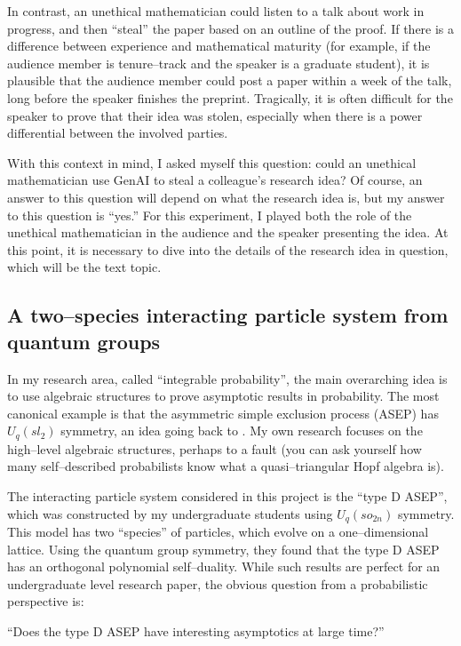 \documentclass{article}
\begin{document}
In contrast, an unethical mathematician could listen to a talk about work in progress, and then ``steal'' the paper based on an outline of the proof. If there is a difference between experience and mathematical maturity (for example, if the audience member is tenure--track and the speaker is a graduate student), it is plausible that the audience member could post a paper within a week of the talk, long before the speaker finishes the preprint. Tragically, it is often difficult for the speaker to prove that their idea was stolen, especially when there is a power differential between the involved parties. 

With this context in mind, I asked myself this question: could an unethical mathematician use GenAI to steal a colleague's research idea? Of course, an answer to this question will depend on what the research idea is, but my answer to this question is ``yes.'' For this experiment, I played both the role of the unethical mathematician in the audience and the speaker presenting the idea. At this point, it is necessary to dive into the details of the research idea in question, which will be the text topic. 

\subsection{A two--species interacting particle system from quantum groups}

In my research area, called ``integrable probability'', the main overarching idea is to use algebraic structures to prove asymptotic results in probability. The most canonical example is that the asymmetric simple exclusion process (ASEP) has $U_q(sl_2)$ symmetry, an idea going back to \cite{Sch97}. My own research focuses on the high--level algebraic structures, perhaps to a fault (you can ask yourself how many self--described probabilists know what a quasi--triangular Hopf algebra is). 

The interacting particle system considered in this project is the ``type D ASEP'', which was constructed by my undergraduate students using $U_q(so_{2n})$ symmetry. This model has two ``species'' of particles, which evolve on a one--dimensional lattice. Using the quantum group symmetry, they found that the type D ASEP has an orthogonal polynomial self--duality. While such results are perfect for an undergraduate level research paper, the obvious question from a probabilistic perspective is:

``Does the type D ASEP \cite{REU2020,REU2022,REU2023,REU2024} have interesting asymptotics at large time?'' 
\end{document}
